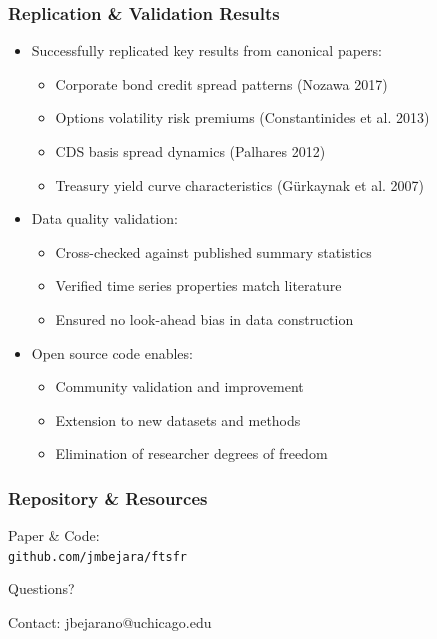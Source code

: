 \documentclass[ignorenonframetext, 9pt]{beamer}
\begin{document}
\begin{frame}
  \frametitle{Replication \& Validation Results}
  \label{slide:validation}
\begin{itemize}
\item \alert{Successfully replicated key results from canonical papers:}
\begin{itemize}
  \item Corporate bond credit spread patterns (Nozawa 2017)
  \item Options volatility risk premiums (Constantinides et al. 2013)
  \item CDS basis spread dynamics (Palhares 2012)
  \item Treasury yield curve characteristics (Gürkaynak et al. 2007)
\end{itemize}
\vspace{0.3cm}
\item \alert{Data quality validation:}
\begin{itemize}
  \item Cross-checked against published summary statistics
  \item Verified time series properties match literature
  \item Ensured no look-ahead bias in data construction
\end{itemize}
\vspace{0.3cm}
\item \alert{Open source code enables:}
\begin{itemize}
  \item Community validation and improvement
  \item Extension to new datasets and methods
  \item Elimination of researcher degrees of freedom
\end{itemize}
\end{itemize}
\end{frame}



\begin{frame}
  \frametitle{Repository \& Resources}
  \centering
  \vspace{1cm}
  \Large
  \alert{Paper \& Code:} \\
  \texttt{github.com/jmbejara/ftsfr}
  \vspace{1cm}

  \alert{Questions?}
  \vspace{0.5cm}

  \normalsize
Contact: jbejarano@uchicago.edu
\end{frame}
\end{document}
